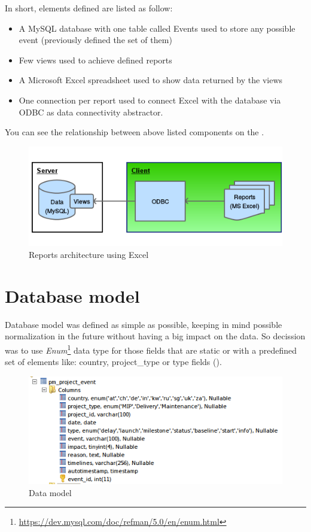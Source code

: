In short, elements defined are listed as follow:
\begin{itemize}
  \item A MySQL database with one table called Events used to store any possible
  event (previously defined the set of them)
  \item Few views used to achieve defined reports
  \item A Microsoft Excel spreadsheet used to show data returned by the views
  \item One connection per report used to connect Excel with the database
  via ODBC as data connectivity abstractor. 
\end{itemize}

You can see the relationship between above listed components on the 
.
 
\begin{figure}[ht!]
	\centering
   	\includegraphics[width=1\textwidth]{./resources/excel_architecture.png}
   	\caption{Reports architecture using Excel}
   	\label{f_excel_architecture}
\end{figure}

\section{Database model}
Database model was defined as simple as possible, keeping in mind
possible normalization in the future without having a big impact on the data. So
decission was to use
\emph{Enum}\footnote{\url{https://dev.mysql.com/doc/refman/5.0/en/enum.html}}
data type for those fields that are static or with a predefined set of
elements like: country, project\_type or  type fields
().

\begin{figure}[ht!]
	\centering
   	\includegraphics[width=1\textwidth]{./resources/data_model.png}
   	\caption{Data model}
   	\label{f_data_model}
\end{figure}

